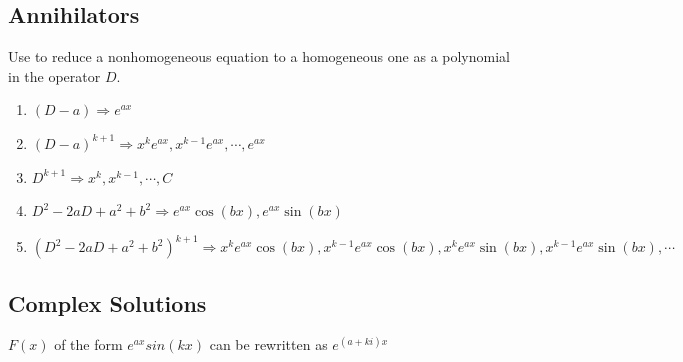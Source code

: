 \documentclass[a4paper,10pt]{report}
\begin{document}
\subsection{Annihilators}
Use to reduce a nonhomogeneous equation to a homogeneous one as a polynomial in the operator $D$.
\begin{enumerate}
	\item $(D-a) \Rightarrow e^{ax}$
	\item $(D-a)^{k+1} \Rightarrow x^k e^{ax}, x^{k-1}e^{ax}, \cdots, e^{ax}$
	\item $D^{k+1} \Rightarrow x^k, x^{k-1}, \cdots,C$
	\item $D^2-2aD+a^2+b^2 \Rightarrow e^{ax}\cos(bx), e^{ax}\sin(bx)$
	\item $(D^2-2aD+a^2+b^2)^{k+1} \Rightarrow x^k e^{ax}\cos(bx), x^{k-1} e^{ax}\cos(bx), x^k e^{ax}\sin(bx), x^{k-1}e^{ax}\sin(bx),\cdots$
\end{enumerate}

\subsection{Complex Solutions}
$F(x)$ of the form $e^{ax}sin(kx)$ can be rewritten as $e^{(a+ki)x}$
\end{document}
